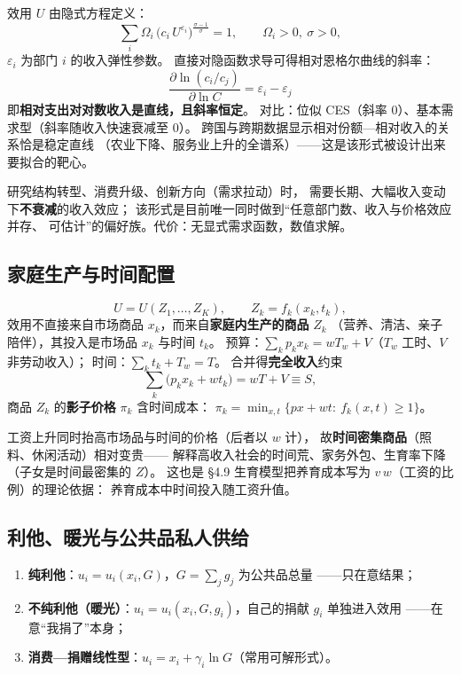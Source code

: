 效用 $U$ 由隐式方程定义：
\[
\sum_i \Omega_i\,\bigl(c_i\,U^{\varepsilon_i}\bigr)^{\frac{\sigma-1}{\sigma}}=1,
\qquad \Omega_i>0,\ \sigma>0,
\]
$\varepsilon_i$ 为部门 $i$ 的收入弹性参数。
直接对隐函数求导可得相对恩格尔曲线的斜率：
\[
\boxed{\ \frac{\partial\ln(c_i/c_j)}{\partial\ln C}=\varepsilon_i-\varepsilon_j\ }
\]
即\textbf{相对支出对对数收入是直线，且斜率恒定}。
对比：位似 CES（斜率 0）、基本需求型（斜率随收入快速衰减至 0）。
跨国与跨期数据显示相对份额—相对收入的关系恰是稳定直线
（农业下降、服务业上升的全谱系）——这是该形式被设计出来要拟合的靶心。

研究结构转型、消费升级、创新方向（需求拉动）时，
需要长期、大幅收入变动下\textbf{不衰减}的收入效应；
该形式是目前唯一同时做到“任意部门数、收入与价格效应并存、
可估计”的偏好族。代价：无显式需求函数，数值求解。

\subsection{家庭生产与时间配置}

\[
U=U(Z_1,\dots,Z_K),\qquad Z_k=f_k(x_k,t_k),
\]
效用不直接来自市场商品 $x_k$，而来自\textbf{家庭内生产的商品} $Z_k$
（营养、清洁、亲子陪伴），其投入是市场品 $x_k$ 与时间 $t_k$。
预算：$\sum_k p_kx_k=wT_w+V$（$T_w$ 工时、$V$ 非劳动收入）；
时间：$\sum_k t_k+T_w=T$。
合并得\textbf{完全收入}约束
\[
\sum_k\bigl(p_kx_k+wt_k\bigr)=wT+V\equiv S,
\]
商品 $Z_k$ 的\textbf{影子价格} $\pi_k$ 含时间成本：
$\pi_k=\min_{x,t}\{px+wt:\ f_k(x,t)\ge1\}$。

工资上升同时抬高市场品与时间的价格（后者以 $w$ 计），
故\textbf{时间密集商品}（照料、休闲活动）相对变贵——
解释高收入社会的时间荒、家务外包、生育率下降
（子女是时间最密集的 $Z$）。
这也是 §4.9 生育模型把养育成本写为 $v\,w$（工资的比例）的理论依据：
养育成本中时间投入随工资升值。

\subsection{利他、暖光与公共品私人供给}

\begin{enumerate}
  \item \textbf{纯利他}：$u_i=u_i(x_i,G)$，$G=\sum_j g_j$ 为公共品总量
        ——只在意结果；
  \item \textbf{不纯利他（暖光）}：$u_i=u_i(x_i,G,g_i)$，自己的捐献 $g_i$ 单独进入效用
        ——在意“我捐了”本身；
  \item \textbf{消费—捐赠线性型}：$u_i=x_i+\gamma_i\ln G$（常用可解形式）。
\end{enumerate}

